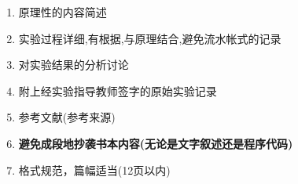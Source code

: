\begin{enumerate}
  \item 原理性的内容简述
  \item 实验过程详细,有根据,与原理结合,避免流水帐式的记录
  \item 对实验结果的分析讨论
  \item 附上经实验指导教师签字的原始实验记录
  \item 参考文献(参考来源)
  \item {\bf 避免成段地抄袭书本内容(无论是文字叙述还是程序代码)}
  \item 格式规范，篇幅适当(12页以内)
\end{enumerate}
\endslide
